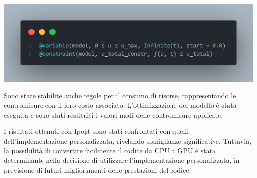 \begin{minipage}{\linewidth}
	\centering
	\includegraphics[width=\textwidth]{img/controller_rules_1.png}
	\label{fig:controller_rules_1}
\end{minipage}

Sono state stabilite anche regole per il consumo di risorse, 
rappresentando le contromisure con il loro costo associato. 
L'ottimizzazione del modello è stata eseguita e sono stati restituiti 
i valori medi delle contromisure applicate.

I risultati ottenuti con Ipopt sono stati confrontati con quelli 
dell'implementazione personalizzata, rivelando somiglianze 
significative. Tuttavia, la possibilità di convertire facilmente 
il codice da CPU a GPU è stata determinante nella decisione di 
utilizzare l'implementazione personalizzata, in previsione di futuri 
miglioramenti delle prestazioni del codice.

